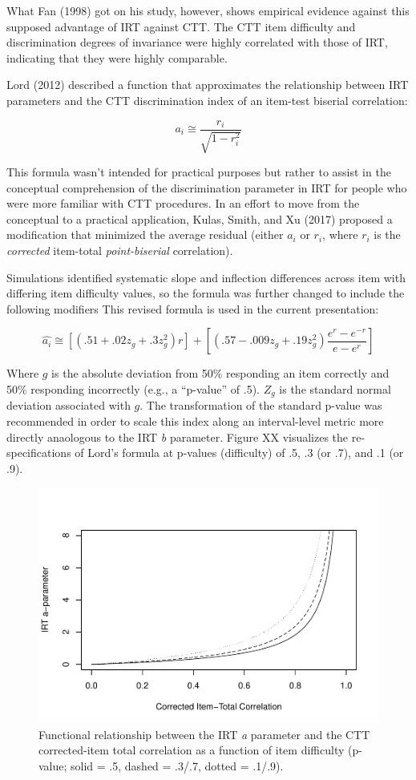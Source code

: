\documentclass[
  english,
  man,floatsintext]{apa6}
\begin{document}
What Fan (1998) got on his study, however, shows empirical evidence against this supposed advantage of IRT against CTT. The CTT item difficulty and discrimination degrees of invariance were highly correlated with those of IRT, indicating that they were highly comparable.

Lord (2012) described a function that approximates the relationship between IRT parameters and the CTT discrimination index of an item-test biserial correlation:

\[a_i\cong \frac{r_i}{\sqrt{1-r_i^2}}\]

This formula wasn't intended for practical purposes but rather to assist in the conceptual comprehension of the discrimination parameter in IRT for people who were more familiar with CTT procedures. In an effort to move from the conceptual to a practical application, Kulas, Smith, and Xu (2017) proposed a modification that minimized the average residual (either \(a_i\) or \(r_i\), where \(r_i\) is the \emph{corrected} item-total \emph{point-biserial} correlation).

Simulations identified systematic slope and inflection differences across item with differing item difficulty values, so the formula was further changed to include the following modifiers This revised formula is used in the current presentation:

\[\hat{a_i}\cong[(.51 + .02z_g + .3z_g^2)r]+[(.57 - .009z_g + .19z_g^2)\frac{e^r-e^{-r}}{e-e^r}]\]

Where \(g\) is the absolute deviation from 50\% responding an item correctly and 50\% responding incorrectly (e.g., a ``p-value'' of .5). \(Z_g\) is the standard normal deviation associated with \(g\). The transformation of the standard p-value was recommended in order to scale this index along an interval-level metric more directly anaologous to the IRT \emph{b} parameter. Figure XX visualizes the re-specifications of Lord's formula at p-values (difficulty) of .5, .3 (or .7), and .1 (or .9).

\begin{figure}
\centering
\includegraphics{ICC_project_files/figure-latex/acorrected-1.pdf}
\caption{\label{fig:acorrected}Functional relationship between the IRT \emph{a} parameter and the CTT corrected-item total correlation as a function of item difficulty (p-value; solid = .5, dashed = .3/.7, dotted = .1/.9).}
\end{figure}
\end{document}
